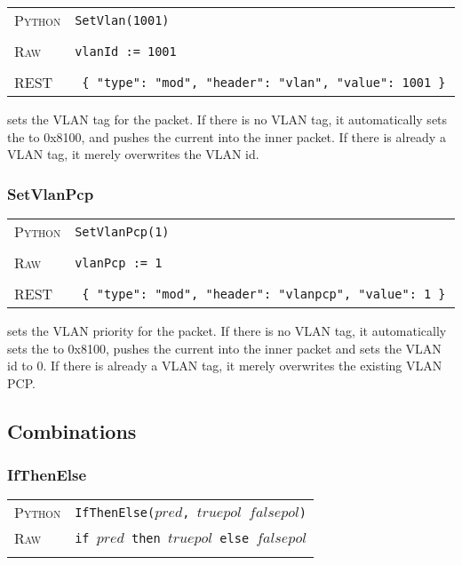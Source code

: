 \bigskip
\begin{tabularx}{\linewidth}{lX}
\textsc{Python}   & \texttt{SetVlan(1001)} \\ \\
\textsc{Raw}    & \texttt{vlanId := 1001}     \\ \\
\textsc{REST} & \texttt{ \{ "type": "mod", "header": "vlan", "value": 1001 \} }
\end{tabularx}

 sets the VLAN tag for the packet.  If there is no VLAN tag, it automatically sets 
the  to 0x8100, and pushes the current  into the inner packet.  If there
is already a VLAN tag, it merely overwrites the VLAN id.

\subsubsection{SetVlanPcp}

\bigskip
\begin{tabularx}{\linewidth}{lX}
\textsc{Python}   & \texttt{SetVlanPcp(1)} \\ \\
\textsc{Raw}    & \texttt{vlanPcp := 1}     \\ \\
\textsc{REST} & \texttt{ \{ "type": "mod", "header": "vlanpcp", "value": 1 \} }
\end{tabularx}

 sets the VLAN priority for the packet.  If there is no VLAN tag, it automatically sets 
the  to 0x8100, pushes the current  into the inner packet and sets the
VLAN id to 0.  If there
is already a VLAN tag, it merely overwrites the existing VLAN PCP.

\subsection{Combinations}

\subsubsection{IfThenElse}

\bigskip
\begin{tabularx}{\linewidth}{lX}
\textsc{Python}   & \texttt{IfThenElse($pred$, $truepol$ $falsepol$)} \\
\textsc{Raw}    & \texttt{if $pred$ then $truepol$ else $falsepol$}  \\ \\
\end{tabularx}

